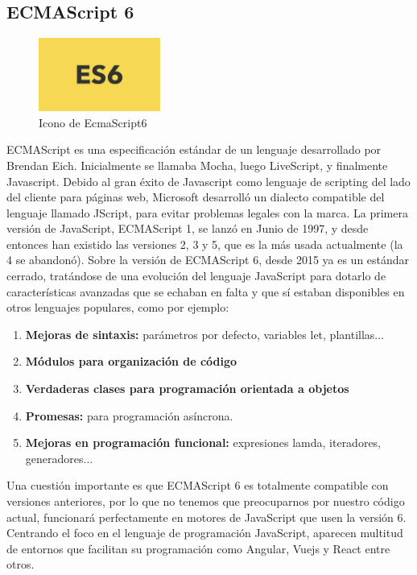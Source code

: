 \subsection{ECMAScript 6}
\begin{figure}[!h]
    \centering
    \includegraphics[width=40mm]{img/introduccion/ecma6.jpg}
    \caption{Icono de EcmaScript6}
\end{figure}
ECMAScript es una especificación estándar de un lenguaje desarrollado por Brendan Eich. Inicialmente se llamaba Mocha, luego LiveScript, y finalmente Javascript. Debido al gran éxito de Javascript como lenguaje de scripting del lado del cliente para páginas web, Microsoft desarrolló un dialecto compatible del lenguaje llamado JScript, para evitar problemas legales con la marca.
La primera versión de JavaScript, ECMAScript 1, se lanzó en Junio de 1997, y desde entonces han existido las versiones 2, 3 y 5, que es la más usada actualmente (la 4 se abandonó). Sobre la versión de ECMAScript 6, desde 2015 ya es un estándar cerrado, tratándose de una evolución del lenguaje JavaScript para dotarlo de características avanzadas que se echaban en falta y que sí estaban disponibles en otros lenguajes populares, como por ejemplo:
\begin{enumerate}
    \item \textbf{Mejoras de sintaxis: } parámetros por defecto, variables let, plantillas...
    \item \textbf{Módulos para organización de código }
    \item \textbf{Verdaderas clases para programación orientada a objetos  }
    \item \textbf{Promesas:  }para programación asíncrona.
    \item \textbf{Mejoras en programación funcional: } expresiones lamda, iteradores, generadores...
\end{enumerate}
Una cuestión importante es que ECMAScript 6 es totalmente compatible con versiones anteriores, por lo que no tenemos que preocuparnos por nuestro código actual, funcionará perfectamente en motores de JavaScript que usen la versión 6.
Centrando el foco en el lenguaje de programación JavaScript, aparecen multitud de entornos que facilitan su programación como Angular, Vuejs y React entre otros.
